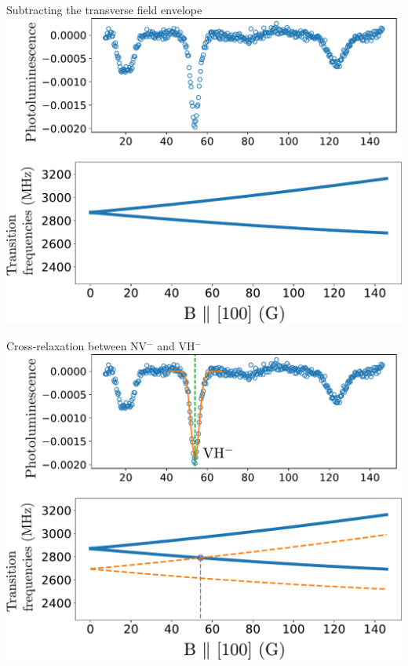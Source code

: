 \documentclass{beamer}
\begin{document}
\begin{frame}{Subtracting the transverse field envelope}
\includegraphics[scale=.48]{soustraction_0}
\end{frame}
\begin{frame}{Cross-relaxation between NV$^-$ and VH$^-$}
\includegraphics[scale=.48]{soustraction_1}
\end{frame}
\end{document}

